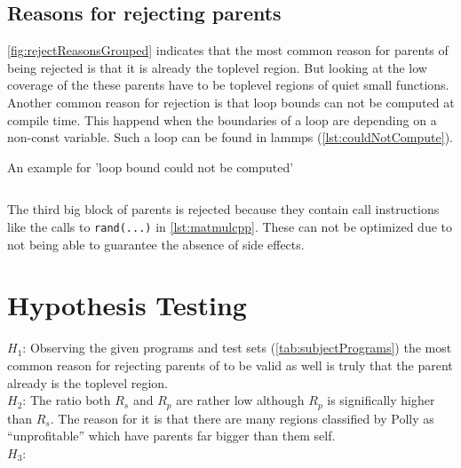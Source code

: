 \subsection{Reasons for rejecting parents}
\autoref{fig:rejectReasonsGrouped} indicates that the most common reason for parents of \scops being rejected is that it is already the toplevel region.
But looking at the low coverage of the \scops these parents have to be toplevel regions of quiet small functions.\\
Another common reason for rejection is that loop bounds can not be computed at compile time.
This happend \eg when the boundaries of a loop are depending on a non-const variable.
Such a loop can be found in lammps (\autoref{lst:couldNotCompute}).
\begin{code}
    \caption{An example for 'loop bound could not be computed'}
    \inputminted{c}{c/nonAffineLoopBoundCouldNotCompute.c}
    \label{lst:couldNotCompute}
\end{code}
The third big block of parents is rejected because they contain call instructions like the calls to \texttt{rand(...)} in \autoref{lst:matmulcpp}.
These can not be optimized due to not being able to guarantee the absence of side effects.\\
\section{Hypothesis Testing}
\(H_1\): Observing the given programs and test sets (\autoref{tab:subjectPrograms}) the most common reason for rejecting parents of \scop to be valid as well is truly that the parent already is the toplevel region.\\
\(H_2\): The ratio both \(R_s\) and \(R_p\) are rather low although \(R_p\) is significally higher than \(R_s\).
The reason for it is that there are many regions classified by Polly as \enquote{unprofitable} which have parents far bigger than them self.\\
\(H_3\): \\
